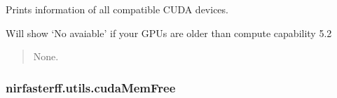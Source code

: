 \documentclass[letterpaper,10pt,english]{sphinxmanual}
\begin{document}
\begin{fulllineitems}
\label{\detokenize{_autosummary/nirfasterff.utils.cudaDeviceInfo:nirfasterff.utils.cudaDeviceInfo}}
\pysigstartsignatures
\pysiglinewithargsret
{}
{}
{}
\pysigstopsignatures
\sphinxAtStartPar
Prints information of all compatible CUDA devices.

\sphinxAtStartPar
Will show ‘No avaiable’ if your GPUs are older than compute capability 5.2
\begin{quote}\begin{description}
\sphinxAtStartPar
None.

\end{description}\end{quote}

\end{fulllineitems}


\sphinxstepscope


\subsubsection{nirfasterff.utils.cudaMemFree}
\label{\detokenize{_autosummary/nirfasterff.utils.cudaMemFree:nirfasterff-utils-cudamemfree}}\label{\detokenize{_autosummary/nirfasterff.utils.cudaMemFree::doc}}
\end{document}
